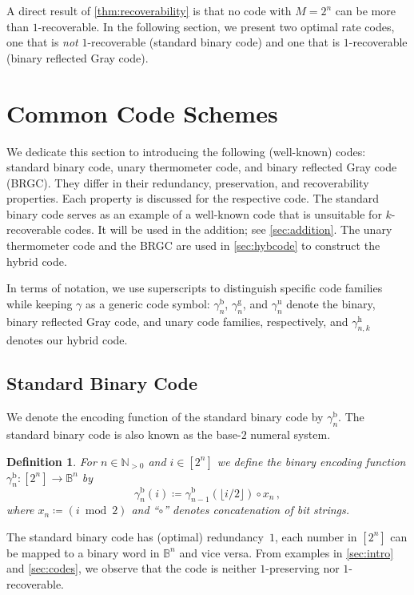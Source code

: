 \documentclass[9pt,journal,compsoc]{IEEEtran}
\newtheorem{definition}[theorem]{Definition}
\theoremstyle{remark}
\newcommand{\IN}{\mathbb{N}}
\newcommand{\IB}{\mathbb{B}}
\newcommand{\floor}[1]{\lfloor{#1}\rfloor}
\newcommand{\gBin}[1]{\gamma_{#1}^{\operatorname{b}}}
\newcommand{\gBRGC}[1]{\gamma_{#1}^{\operatorname{g}}}
\newcommand{\gUnary}[1]{\gamma_{#1}^{\operatorname{u}}}
\newcommand{\gHyb}[1]{\gamma_{#1}^{\operatorname{h}}}
\begin{document}
A direct result of \cref{thm:recoverability} is that no code with $M = 2^n$ can
be more than $1$-recoverable.
In the following section, we present two optimal rate codes, one that is
\emph{not} $1$-recoverable (standard binary code) and one that is $1$-recoverable (binary reflected Gray code).

\section{Common Code Schemes}\label{sec:enc_examplecodes}

We dedicate this section to introducing the following (well-known) codes: 
  standard binary code, 
  unary thermometer code, and
  binary reflected Gray code (BRGC).
They differ in their redundancy, preservation, and recoverability 
  properties.
Each property is discussed for the respective code.
The standard binary code serves as an example of a 
  well-known code that is unsuitable for $k$-recoverable codes.
It will be used in the addition; see \cref{sec:addition}.
The unary thermometer code and the BRGC are used in \cref{sec:hybcode}
  to construct the hybrid code.

  In terms of notation, we use superscripts to distinguish specific code families while keeping
$\gamma$ as a generic code symbol: $\gBin{n}$, $\gBRGC{n}$, and $\gUnary{n}$ denote the binary, binary reflected Gray code, and unary code families, respectively, and $\gHyb{n,k}$ denotes our hybrid code.

\subsection{Standard Binary Code}

We denote the encoding function of the standard binary code by $\gBin{n}$.
The standard binary code is also known as the base-$2$ numeral system.

\begin{definition}
  For $n\in\IN_{>0}$ and $i\in[2^n]$ we define the binary 
    encoding function $\gBin{n}\colon[2^n]\rightarrow\IB^n$ by
  \begin{equation*}
    \gBin{n}(i)\coloneqq \gBin{n-1}(\floor{i / 2}) \circ x_n\,,
  \end{equation*}
  where $x_n \coloneqq (i \bmod 2)$ and ``$\circ$''  denotes concatenation of bit strings. %
\end{definition}

The standard binary code has (optimal) redundancy~$1$, each number in $[2^n]$
  can be mapped to a binary word in $\IB^n$ and vice versa.
From examples in \cref{sec:intro} and \cref{sec:codes}, we observe that the code is neither $1$-preserving nor $1$-recoverable.
\end{document}

